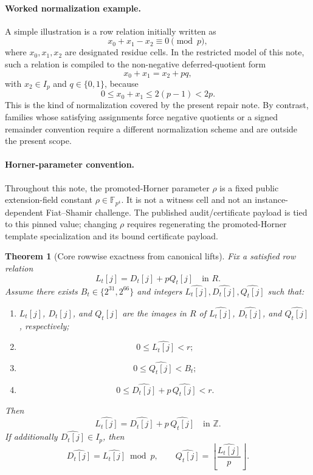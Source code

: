 ﻿\documentclass[11pt]{article}
\newtheorem{theorem}{Theorem}[section]
\newcommand{\Z}{\mathbb{Z}}
\newcommand{\Ep}{\mathbb{F}_{p^4}}
\newcommand{\wt}[1]{\widehat{#1}}
\begin{document}
\paragraph{Worked normalization example.}
A simple illustration is a row relation initially written as
\[
x_0+x_1-x_2 \equiv 0 \pmod p,
\]
where \(x_0,x_1,x_2\) are designated residue cells. In the restricted model of
this note, such a relation is compiled to the non-negative deferred-quotient
form
\[
x_0+x_1 = x_2 + p q,
\]
with \(x_2\in I_p\) and \(q\in\{0,1\}\), because
\[
0\le x_0+x_1\le 2(p-1)<2p.
\]
This is the kind of normalization covered by the present repair note. By
contrast, families whose satisfying assignments force negative quotients or a
signed remainder convention require a different normalization scheme and are
outside the present scope.

\paragraph{Horner-parameter convention.}
Throughout this note, the promoted-Horner parameter \(\rho\) is a fixed public
extension-field constant \(\rho\in\Ep\). It is not a witness cell and not an
instance-dependent Fiat--Shamir challenge. The published
audit/certificate payload is tied to this pinned value; changing \(\rho\)
requires regenerating the promoted-Horner template specialization and its bound
certificate payload.

\begin{theorem}[Core rowwise exactness from canonical lifts]
\label{thm:core-rowwise-exactness}
Fix a satisfied row relation
\[
L_t[j]=D_t[j]+pQ_t[j]\quad\text{in }R.
\]
Assume there exists \(B_t\in\{2^{31},2^{66}\}\) and integers
\(\wt{L_t[j]},\wt{D_t[j]},\wt{Q_t[j]}\) such that:
\begin{enumerate}[label=(\roman*),leftmargin=2em]
    \item \(L_t[j]\), \(D_t[j]\), and \(Q_t[j]\) are the images in \(R\) of
    \(\wt{L_t[j]}\), \(\wt{D_t[j]}\), and \(\wt{Q_t[j]}\), respectively;
    \item
    \[
    0\le \wt{L_t[j]}<r;
    \]
    \item
    \[
    0\le \wt{Q_t[j]}<B_t;
    \]
    \item
    \[
    0\le \wt{D_t[j]}+p\,\wt{Q_t[j]}<r.
    \]
\end{enumerate}
Then
\[
\wt{L_t[j]}=\wt{D_t[j]}+p\,\wt{Q_t[j]}
\quad\text{in }\Z.
\]
If additionally \(\wt{D_t[j]}\in I_p\), then
\[
\wt{D_t[j]}=\wt{L_t[j]}\bmod p,
\qquad
\wt{Q_t[j]}=\left\lfloor\frac{\wt{L_t[j]}}{p}\right\rfloor.
\]
\end{theorem}
\end{document}
